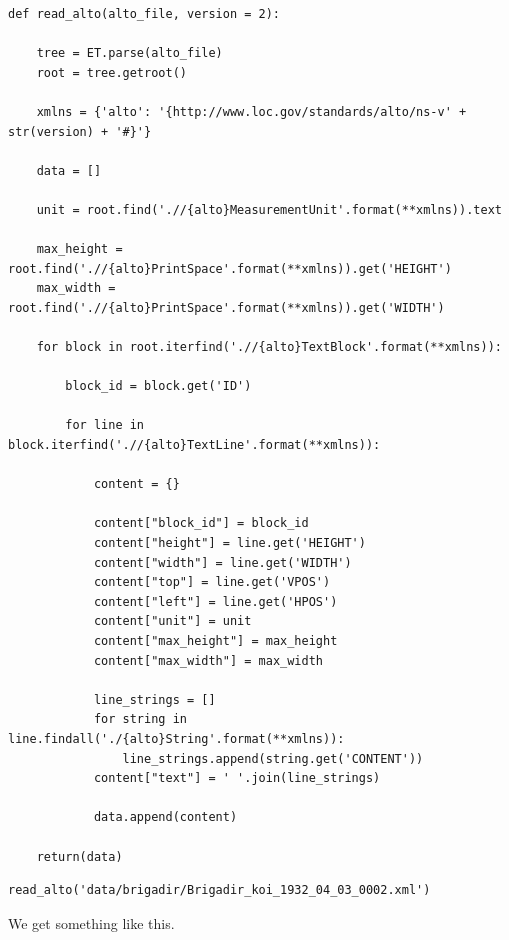 \documentclass[]{book}
\begin{document}
\begin{verbatim}
def read_alto(alto_file, version = 2):
    
    tree = ET.parse(alto_file)
    root = tree.getroot()

    xmlns = {'alto': '{http://www.loc.gov/standards/alto/ns-v' + str(version) + '#}'}
    
    data = []

    unit = root.find('.//{alto}MeasurementUnit'.format(**xmlns)).text

    max_height = root.find('.//{alto}PrintSpace'.format(**xmlns)).get('HEIGHT')
    max_width = root.find('.//{alto}PrintSpace'.format(**xmlns)).get('WIDTH')

    for block in root.iterfind('.//{alto}TextBlock'.format(**xmlns)):
        
        block_id = block.get('ID')

        for line in block.iterfind('.//{alto}TextLine'.format(**xmlns)):

            content = {}

            content["block_id"] = block_id
            content["height"] = line.get('HEIGHT')
            content["width"] = line.get('WIDTH')
            content["top"] = line.get('VPOS')
            content["left"] = line.get('HPOS')
            content["unit"] = unit
            content["max_height"] = max_height
            content["max_width"] = max_width

            line_strings = []
            for string in line.findall('./{alto}String'.format(**xmlns)):
                line_strings.append(string.get('CONTENT'))
            content["text"] = ' '.join(line_strings)
            
            data.append(content)
        
    return(data)
\end{verbatim}

\begin{verbatim}
read_alto('data/brigadir/Brigadir_koi_1932_04_03_0002.xml')
\end{verbatim}

We get something like this.
\end{document}

